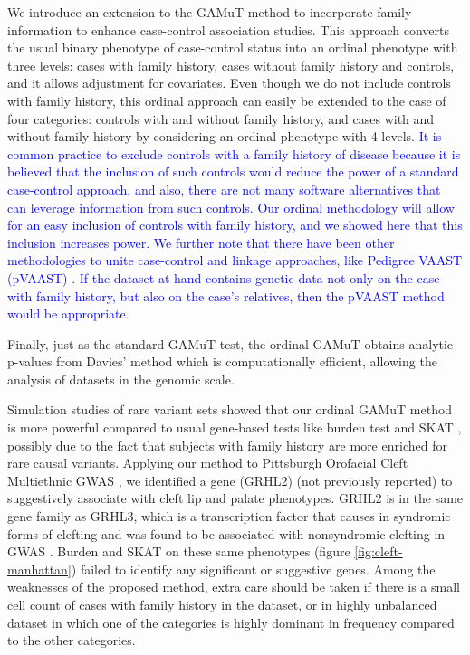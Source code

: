 \documentclass[]{article}
\theoremstyle{definition}
\theoremstyle{definition}
\theoremstyle{definition}
\theoremstyle{remark}
\begin{document}
We introduce an extension to the GAMuT method \citep{Broadaway2016} to
incorporate family information to enhance case-control association
studies. This approach converts the usual binary phenotype of
case-control status into an ordinal phenotype with three levels: cases
with family history, cases without family history and controls, and it
allows adjustment for covariates. Even though we do not include controls
with family history, this ordinal approach can easily be extended to the
case of four categories: controls with and without family history, and
cases with and without family history by considering an ordinal
phenotype with 4 levels.
\textcolor{blue}{It is common practice to exclude controls with a family history of disease because it is believed that the inclusion of such controls would reduce the power of a standard case-control approach, and also, there are not many software alternatives that can leverage information from such controls. Our ordinal methodology will allow for an easy inclusion of controls with family history, and we showed here that this inclusion increases power. We further note that there have been other methodologies to unite
case-control and linkage approaches, like Pedigree VAAST (pVAAST)}
\citep{Hu2014}.
\textcolor{blue}{If the dataset at hand contains genetic data not only on the case with family history, but also on the case's relatives, then the pVAAST method would be appropriate.}

Finally, just as the standard GAMuT test, the ordinal GAMuT obtains
analytic p-values from Davies' method \citep{Davies1980} which is
computationally efficient, allowing the analysis of datasets in the
genomic scale.

Simulation studies of rare variant sets showed that our ordinal GAMuT
method is more powerful compared to usual gene-based tests like burden
test \citep{Li2008, Madsen2009} and SKAT \citep{Wu2011}, possibly due to
the fact that subjects with family history are more enriched for rare
causal variants. Applying our method to Pittsburgh Orofacial Cleft
Multiethnic GWAS \citep{Leslie2016, Leslie2016b}, we identified a gene
(GRHL2) (not previously reported) to suggestively associate with cleft
lip and palate phenotypes. GRHL2 is in the same gene family as GRHL3,
which is a transcription factor that causes in syndromic forms of
clefting and was found to be associated with nonsyndromic clefting in
GWAS \citep{Leslie2016, Leslie2016b, Carpinelli2017, PeyrardJanvid2014}.
Burden and SKAT on these same phenotypes (figure
\ref{fig:cleft-manhattan}) failed to identify any significant or
suggestive genes. Among the weaknesses of the proposed method, extra
care should be taken if there is a small cell count of cases with family
history in the dataset, or in highly unbalanced dataset in which one of
the categories is highly dominant in frequency compared to the other
categories.
\end{document}
